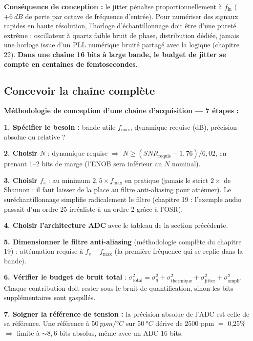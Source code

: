 \documentclass[12pt,a4paper,twoside]{book}
\begin{document}
\begin{attention}
\textbf{Conséquence de conception :} le jitter pénalise proportionnellement à $f_{\text{in}}$ ($+\SI{6}{dB}$ de perte par octave de fréquence d'entrée). Pour numériser des signaux rapides en haute résolution, l'horloge d'échantillonnage doit être d'une pureté extrême : oscillateur à quartz faible bruit de phase, distribution dédiée, jamais une horloge issue d'un PLL numérique bruité partagé avec la logique (chapitre 22). \textbf{Dans une chaîne 16 bits à large bande, le budget de jitter se compte en centaines de femtosecondes.}
\end{attention}

\subsection{Concevoir la chaîne complète}

\begin{pratique}
\textbf{Méthodologie de conception d'une chaîne d'acquisition --- 7 étapes :}

\textbf{1. Spécifier le besoin :} bande utile $f_{\max}$, dynamique requise (dB), précision absolue ou relative ?

\textbf{2. Choisir $N$} : dynamique requise $\Rightarrow$ $N \geq (SNR_{\text{requis}} - 1{,}76)/6{,}02$, en prenant 1--2 bits de marge (l'ENOB sera inférieur au $N$ nominal).

\textbf{3. Choisir $f_s$} : au minimum $2{,}5 \times f_{\max}$ en pratique (jamais le strict $2\times$ de Shannon : il faut laisser de la place au filtre anti-aliasing pour atténuer). Le suréchantillonnage simplifie radicalement le filtre (chapitre 19 : l'exemple audio passait d'un ordre 25 irréaliste à un ordre 2 grâce à l'OSR).

\textbf{4. Choisir l'architecture ADC} avec le tableau de la section précédente.

\textbf{5. Dimensionner le filtre anti-aliasing} (méthodologie complète du chapitre 19) : atténuation requise à $f_s - f_{\max}$ (la première fréquence qui se replie dans la bande).

\textbf{6. Vérifier le budget de bruit total} : $\sigma_{\text{total}}^2 = \sigma_q^2 + \sigma_{\text{thermique}}^2 + \sigma_{\text{jitter}}^2 + \sigma_{\text{ampli}}^2$. Chaque contribution doit rester sous le bruit de quantification, sinon les bits supplémentaires sont gaspillés.

\textbf{7. Soigner la référence de tension :} la précision absolue de l'ADC est celle de sa référence. Une référence à $\SI{50}{ppm/°C}$ sur $\SI{50}{°C}$ dérive de $2500$ ppm $=$ 0,25\% $\Rightarrow$ limite à $\sim 8{,}6$ bits absolus, même avec un ADC 16 bits.
\end{pratique}
\end{document}
